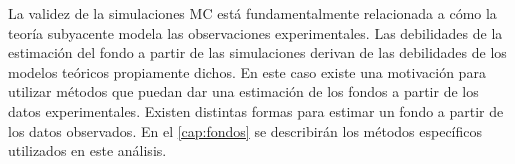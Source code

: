 






La validez de la simulaciones MC está fundamentalmente relacionada a cómo la
teoría subyacente modela las observaciones experimentales. Las debilidades de la
estimación del fondo a partir de las simulaciones derivan de las debilidades de
los modelos teóricos propiamente dichos. En este caso existe una motivación para
utilizar métodos que puedan dar una estimación de los fondos a partir de los
datos experimentales. Existen distintas formas para estimar un fondo a partir de
los datos observados. En el \cref{cap:fondos} se describirán los métodos
específicos utilizados en este análisis.

